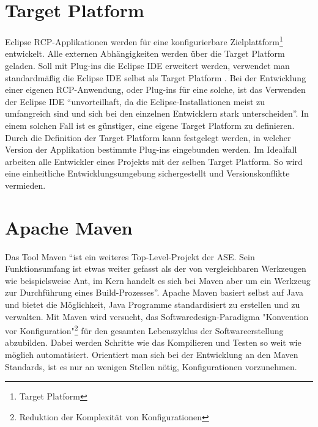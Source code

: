 \section{Target Platform}{
\label{sec:target_plattform}
Eclipse \ac{RCP}-Applikationen werden für eine konfigurierbare Zielplattform\footnote{Target Platform} entwickelt. Alle externen Abhängigkeiten werden über die Target Platform geladen. Soll mit Plug-ins die Eclipse \ac{IDE} erweitert werden, verwendet man standardmäßig die Eclipse \ac{IDE} selbst als Target Platform \cite[vgl. S.14]{RalfEbert}. Bei der Entwicklung einer eigenen \ac{RCP}-Anwendung, oder Plug-ins für eine solche, ist das Verwenden der Eclipse \ac{IDE} "`unvorteilhaft, da die Eclipse-Installationen meist zu umfangreich sind und sich bei den einzelnen Entwicklern stark unterscheiden"'\cite[S.13]{eclipse_magazin}. In einem solchen Fall ist es günstiger, eine eigene Target Platform zu definieren. Durch die Definition der Target Platform kann festgelegt werden, in welcher Version der Applikation bestimmte Plug-ins eingebunden werden. Im Idealfall arbeiten alle Entwickler eines Projekts mit der selben Target Platform. So wird eine einheitliche Entwicklungsumgebung sichergestellt und Versionskonflikte vermieden.
}

\section{Apache Maven}{
\label{sec:apache_maven}
Das Tool Maven "`ist ein weiteres Top-Level-Projekt der \ac{ASE}. Sein Funktionsumfang ist etwas weiter gefasst als der von vergleichbaren Werkzeugen wie beispielsweise Ant, im Kern handelt es sich bei Maven aber um ein Werkzeug zur Durchführung eines Build-Prozesses"'\cite[S.75]{maven_popp}. Apache Maven basiert selbst auf Java und bietet die Möglichkeit, Java Programme standardisiert zu erstellen und zu verwalten. Mit Maven wird versucht, das Softwaredesign-Paradigma "Konvention vor Konfiguration"\footnote{Reduktion der Komplexität von Konfigurationen} für den gesamten Lebenszyklus der Softwareerstellung abzubilden. Dabei werden Schritte wie das Kompilieren und Testen so weit wie möglich automatisiert. Orientiert man sich bei der Entwicklung an den Maven Standards, ist es nur an wenigen Stellen nötig, Konfigurationen vorzunehmen.
}

